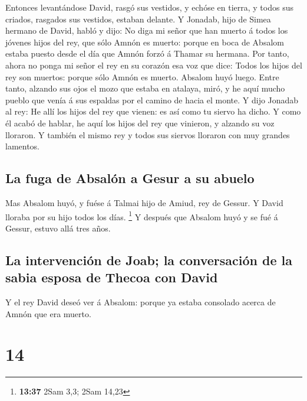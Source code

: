 Entonces levantándose David, rasgó sus vestidos, y echóse
en tierra, y todos sus criados, rasgados sus vestidos, estaban delante.
 Y Jonadab, hijo de Simea hermano de David, habló y dijo:
No diga mi señor que han muerto á todos los jóvenes hijos del rey, que
sólo Amnón es muerto: porque en boca de Absalom estaba puesto desde el
día que Amnón forzó á Thamar su hermana.  Por tanto, ahora
no ponga mi señor el rey en su corazón esa voz que dice: Todos los hijos
del rey son muertos: porque sólo Amnón es muerto.  Absalom
huyó luego. Entre tanto, alzando sus ojos el mozo que estaba en atalaya,
miró, y he aquí mucho pueblo que venía á sus espaldas por el camino de
hacia el monte.  Y dijo Jonadab al rey: He allí los hijos
del rey que vienen: es así como tu siervo ha dicho.  Y como
él acabó de hablar, he aquí los hijos del rey que vinieron, y alzando su
voz lloraron. Y también el mismo rey y todos sus siervos lloraron con
muy grandes lamentos.

\hypertarget{la-fuga-de-absaluxf3n-a-gesur-a-su-abuelo}{%
\subsection{La fuga de Absalón a Gesur a su
abuelo}\label{la-fuga-de-absaluxf3n-a-gesur-a-su-abuelo}}

 Mas Absalom huyó, y fuése á Talmai hijo de Amiud, rey de
Gessur. Y David lloraba por su hijo todos los días. \footnote{\textbf{13:37}
  2Sam 3,3; 2Sam 14,23}  Y después que Absalom huyó y se
fué á Gessur, estuvo allá tres años.

\hypertarget{la-intervenciuxf3n-de-joab-la-conversaciuxf3n-de-la-sabia-esposa-de-thecoa-con-david}{%
\subsection{La intervención de Joab; la conversación de la sabia esposa
de Thecoa con
David}\label{la-intervenciuxf3n-de-joab-la-conversaciuxf3n-de-la-sabia-esposa-de-thecoa-con-david}}

 Y el rey David deseó ver á Absalom: porque ya estaba
consolado acerca de Amnón que era muerto.

\hypertarget{section-13}{%
\section{14}\label{section-13}}

